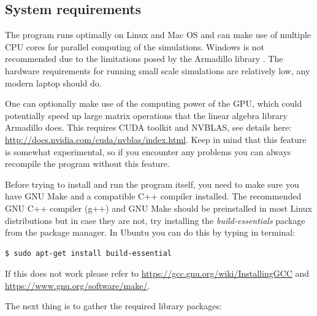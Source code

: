 \documentclass[english,12pt,a4paper,pdftex,sci,utf8]{aaltothesis}
\begin{document}
\subsection{System requirements}
\label{sec:req}
The program runs optimally on Linux and Mac OS and can make use of multiple CPU cores for parallel computing of the simulations. Windows is not recommended due to the limitations posed by the Armadillo library \cite{arma}. The hardware requirements for running small scale simulations are relatively low, any modern laptop should do.
\par One can optionally make use of the computing power of the GPU, which could potentially speed up large matrix operations that the linear algebra library Armadillo does. This requires CUDA toolkit and NVBLAS, see details here: \url{http://docs.nvidia.com/cuda/nvblas/index.html}. Keep in mind that this feature is somewhat experimental, so if you encounter any problems you can always recompile the program without this feature.
\par Before trying to install and run the program itself, you need to make sure you have GNU Make and a compatible C++ compiler installed. The recommended GNU C++ compiler (g++) and GNU Make should be preinstalled in most Linux distributions but in case they are not, try installing the \textit{build-essentials} package from the package manager. In Ubuntu you can do this by typing in terminal:
\begin{verbatim}
$ sudo apt-get install build-essential
\end{verbatim}
If this does not work please refer to \url{https://gcc.gnu.org/wiki/InstallingGCC} and \url{https://www.gnu.org/software/make/}. 
\par The next thing is to gather the required library packages:
\end{document}
